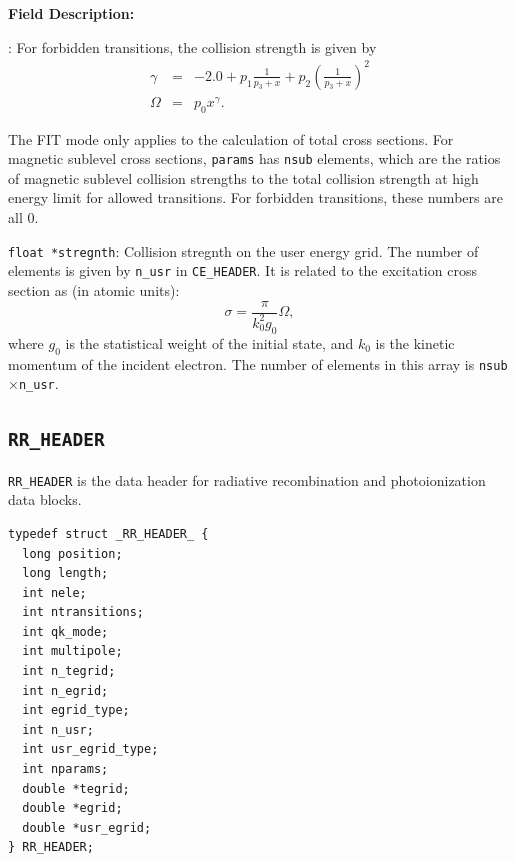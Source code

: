 \documentclass[twoside,letterpaper]{refrep}
\newenvironment{dbdesc}{\textbf{Field Description:} \begin{list}
	{:}{\setlength{\labelwidth}{2in}
	   \setlength{\leftmargin}{2in}
	   \setlength{\labelsep}{0.1in}
	   \setlength{\rightmargin}{0.2in}}}
	{\end{list}}
\begin{document}
\begin{dbdesc}
For forbidden transitions, the collision strength is given by
\begin{eqnarray}
\gamma &=& -2.0 + p_1\frac{1}{p_3+x} + 
p_2\left(\frac{1}{p_3+x}\right)^2\nonumber\\
\Omega &=& p_0x^\gamma.
\end{eqnarray}

The FIT mode only applies to the calculation of total cross sections. For
magnetic sublevel cross sections, \texttt{params} has \texttt{nsub} elements,
which are the ratios of magnetic sublevel collision strengths to the total
collision strength at high energy limit for allowed transitions. For forbidden
transitions, these numbers are all 0.

\item[\texttt{float *stregnth}:] Collision stregnth on the user energy
grid. The number of elements is given by \texttt{n\_usr} in
\texttt{CE\_HEADER}. It is related to the excitation cross section as (in
atomic units):
\begin{equation}
\sigma = \frac{\pi}{k_0^2g_0}\Omega,
\end{equation}
where $g_0$ is the statistical weight of the initial state, and $k_0$ is the
kinetic momentum of the incident electron. The number of elements in this
array is \texttt{nsub}$\times$\texttt{n\_usr}.
\end{dbdesc}

\subsection{\texttt{RR\_HEADER}}
\texttt{RR\_HEADER} is the data header for radiative recombination and
photoionization data blocks.

\begin{verbatim}
typedef struct _RR_HEADER_ {
  long position;
  long length;
  int nele;
  int ntransitions;
  int qk_mode;
  int multipole;
  int n_tegrid;
  int n_egrid;
  int egrid_type;
  int n_usr;
  int usr_egrid_type;
  int nparams;
  double *tegrid;
  double *egrid;
  double *usr_egrid;
} RR_HEADER;
\end{verbatim}
\end{document}
